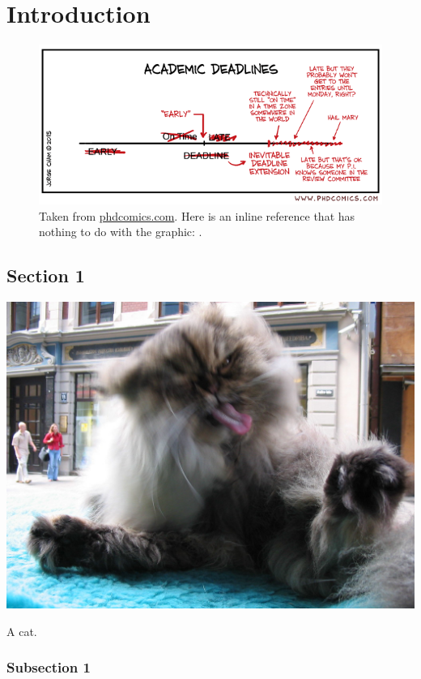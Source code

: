 \documentclass[a4paper,justified,titlepage,twoside,nobib,symmetric]{tufte-book}
\begin{document}
\chapter{Introduction}
\blindtext
\begin{figure}
\includegraphics[width=0.98\linewidth]{deadlines.png}
\caption{Taken from \href{https://www.phdcomics.com}{phdcomics.com}.
Here is an inline reference that has nothing to do with the graphic: .}
\end{figure}
\section{Section 1}
\blindtext
\begin{marginfigure}
\includegraphics[width=0.98\linewidth]{cat.jpg}
\caption{A cat.}
\end{marginfigure}
\subsection{Subsection 1}
\blindtext
\end{document}
